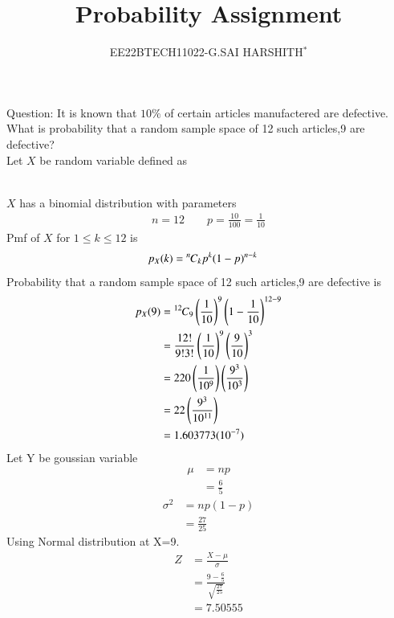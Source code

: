 \documentclass[journal,12pt,twocolumn]{IEEEtran}
\theoremstyle{remark}
\begin{document}

\vspace{3cm}

\title{Probability Assignment}
\author{EE22BTECH11022-G.SAI HARSHITH$^{*}$%
}
\maketitle
\newpage
\bigskip
\renewcommand{\thefigure}{\theenumi}
\renewcommand{\thetable}{\theenumi}

Question: It is known that $10\%$ of certain articles manufactered are defective. What is probability that a random sample space of 12 such articles,9 are defective?\\
\solution
\fi
Let $X$ be random variable defined as
\begin{table}[!ht]
	
\end{table}\\
$X$ has a binomial distribution with parameters
\begin{align}
n=12 \qquad p=\frac{10}{100}=\frac{1}{10}
\end{align}
Pmf of $X$ for $1 \leq k \leq 12$ is
\begin{align}
p_X(k)&={{}^{n}\mkern-1muC_{k}}p^k(1-p)^{n-k}
\end{align}
Probability that a random sample space of 12 such articles,9 are defective is
\begin{align}
p_X(9)&={{}^{12}\mkern-1muC_{9}}\left(\frac{1}{10}\right)^9\left(1-\frac{1}{10}\right)^{12-9}\\
&=\frac{12!}{9!3!}\left(\frac{1}{10}\right)^9\left(\frac{9}{10}\right)^{3}\\
&=220\left(\frac{1}{10^9}\right)\left(\frac{9^3}{10^3}\right)\\
&=22\left(\frac{9^3}{10^{11}}\right)\\
&=1.603773(10^{-7})
\label{eq:9.3.5,1}
\end{align}
Let Y be goussian variable
\begin{align}
\mu&=np\\
&=\frac{6}{5}
\end{align}
\begin{align}
\sigma^2&=np(1-p)\\
&=\frac{27}{25}
\end{align}
Using Normal distribution at X=9.
\begin{align}
Z&=\frac{X-\mu}{\sigma}\\
&=\frac{9-\frac{6}{5}}{\sqrt{\frac{27}{25}}}\\
&=7.50555
\end{align}
\end{document}
